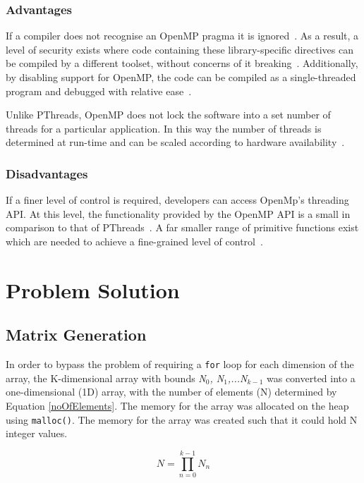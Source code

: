 \documentclass[10pt,twocolumn]{witseiepaper}
\begin{document}
\subsubsection{Advantages}
If a compiler does not recognise an OpenMP pragma it is ignored~\cite{HPC}. As a result, a level of security exists where code containing these library-specific directives can be compiled by a different toolset, without concerns of it breaking~\cite{pthreadVSopen}. Additionally, by disabling support for OpenMP, the code can be compiled as a single-threaded program and debugged with relative ease~\cite{pthreadVSopen}.

Unlike PThreads, OpenMP does not lock the software into a set number of threads for a particular application. In this way the number of threads is determined at run-time and can be scaled according to hardware availability~\cite{pthreadVSopen}.

\subsubsection{Disadvantages}
If a finer level of control is required, developers can access OpenMp's threading API. At this level, the functionality provided by the OpenMP API is a small in comparison to that of PThreads~\cite{pthreadVSopen}. A far smaller range of primitive functions exist which are needed to achieve a fine-grained level of control~\cite{pthreadVSopen}.

\section{Problem Solution}

\subsection{Matrix Generation}
In order to bypass the problem of requiring a \texttt{for} loop for each dimension of the array, the K-dimensional array with bounds \textit{N$_0$, N$_1$,...N$_{k-1}$} was converted into a one-dimensional (1D) array, with the number of elements (N) determined by Equation \ref{noOfElements}. The memory for the array was allocated on the heap using \texttt{malloc()}. The memory for the array was created such that it could hold N integer values.

\begin{equation}
N = \prod_{n=0}^{k-1}N_{n}
\label{noOfElements}
\end{equation}
\end{document}
